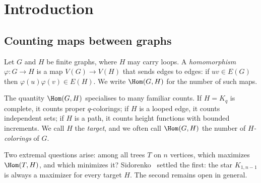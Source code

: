 %
%
%

\section{Introduction}
\label{sec:intro}

\subsection{Counting maps between graphs}

Let $G$ and $H$ be finite graphs, where $H$ may carry loops. A
\emph{homomorphism} $\varphi \colon G \to H$ is a map
$V(G) \to V(H)$ that sends edges to edges: if $uv \in E(G)$ then
$\varphi(u)\varphi(v) \in E(H)$. We write $\Hom(G,H)$ for the number of
such maps.

The quantity $\Hom(G,H)$ specialises to many familiar counts. If
$H = K_q$ is complete, it counts proper $q$-colorings; if $H$ is a
looped edge, it counts independent sets; if $H$ is a path, it counts
height functions with bounded increments. We call $H$ the
\emph{target}, and we often call $\Hom(G,H)$ the number of
\emph{$H$-colorings} of $G$.

Two extremal questions arise: among all trees $T$ on $n$ vertices,
which maximizes $\Hom(T,H)$, and which minimizes it? Sidorenko~\cite{sidorenko1991}
settled the first: the star $K_{1,n-1}$ is always a maximizer for every
target $H$. The second remains open in general.

